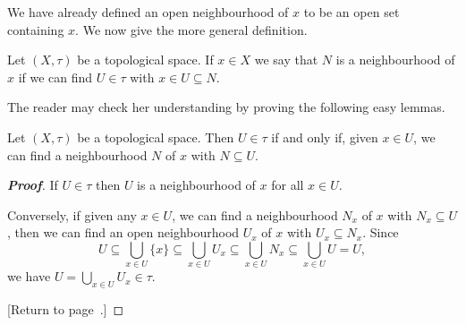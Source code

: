 We have already defined an open neighbourhood of $x$ to be
an open set containing $x$. We now give the more general
definition.
\begin{definition}\label{D;neighbourhood}
Let $(X,\tau)$ be a topological space.
If $x\in X$ we say that $N$ is a neighbourhood of $x$
if we can find $U\in\tau$ with $x\in U\subseteq N$.
\end{definition}

The reader may check her understanding by proving
the following easy lemmas.


\begin{lemma}\label{L;open topology via neighbourhood}
Let $(X,\tau)$ be a topological space.
Then $U\in\tau$ if and only if, given $x\in U$,
we can find a neighbourhood $N$ of $x$
with $N\subseteq U$.
\end{lemma}
\begin{proof}[\bf Proof]
If $U\in\tau$ then $U$ is a neighbourhood of $x$ for all $x\in U$.

Conversely, if given any $x\in U$, we can find a neighbourhood
$N_{x}$ of $x$ with $N_{x}\subseteq U$, then we can find
an open neighbourhood $U_{x}$ of $x$ with $U_{x}\subseteq N_{x}$.
Since
\[U\subseteq\bigcup_{x\in U}\{x\}
\subseteq\bigcup_{x\in U}U_{x}
\subseteq\bigcup_{x\in U}N_{x}
\subseteq\bigcup_{x\in U}U=U,\]
we have $U=\bigcup_{x\in U}U_{x}\in\tau$.

[Return to page~\pageref{L;open topology via neighbourhood}.]
\end{proof}



